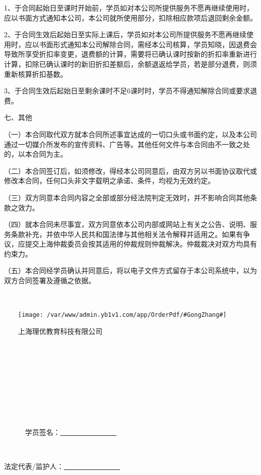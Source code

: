 \documentclass {ctexart}
\begin{document}
1、于合同起始日至课时开始前，学员如对本公司所提供服务不愿再继续使用时，应以书面方式通知本公司，本公司就所使用部分，扣除相应款项后退回剩余金额。


2、于合同生效后起始日至实际上课后，学员如对本公司所提供服务不愿再继续使用时，应以书面形式通知本公司解除合同，需经本公司核算，学员知晓，因退费会导致所享受折扣率变更，退费额的计算，需要将已确认课时按新的折扣率重新进行计算，扣除已确认课时的新旧折扣差额后，余额退返给学员，若是部分退费，则须重新核算折扣基数。


3、于合同生效后起始日至剩余课时不足6课时时，学员不得通知解除合同或要求退费。


七、其他


（一）本合同取代双方就本合同所述事宜达成的一切口头或书面约定，以及本公司通过一切媒介所发布的宣传资料、广告等。其他任何文件与本合同由不一致之处的，以本合同为主。


（二）本合同签订后，如须修改，得经本公司同意后，由双方另以书面协议取代或修改本合同，任何口头非文字载明之承诺、条件，均视为无效约定。


（三）双方同意本合同内容之全部或部分经法院判定无效时，并不影响合同其他条款之效力。


（四）就本合同未尽事宜，双方同意依本公司内部或网站上有关之公告、说明、服务条款补充，并依中华人民共和国法律与其他相关法令解释并适用之。如果有争议，应提交上海仲裁委员会按其适用的仲裁规则仲裁解决。仲裁裁决对双方均具有约束力。


（五）本合同经学员确认并同意后，将以电子文件方式留存于本公司系统中，以为双方合同签署及遵循之依据。


　

\begin{multicols}{2}

　　\texttt{[image: /var/www/admin.yb1v1.com/app/OrderPdf/\#GongZhang\#]}
 

 　　上海理优教育科技有限公司　　　　　　　　




　　　　



　　　　



　　　　

　　　　
　　　　

　　　　

　　　学员签名：\underline{　　　　　　　　}




　　　　

法定代表/监护人：\underline{　　　　　　　　}

　　　　

　　　　


\end{multicols}

\printindex
\end{document}
